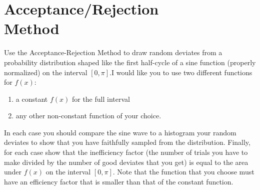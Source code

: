 \section{Acceptance/Rejection \\Method}

Use the Acceptance-Rejection Method to
draw random deviates from a probability distribution shaped like the first half-cycle of a sine
function (properly normalized) on the interval $[0,\pi]$.I would like you to use two different
functions for $f(x)$:
\begin{enumerate}
    \item a constant $f(x)$ for the full interval
    \item any other non-constant function of your choice.
\end{enumerate}

In each case you should compare the sine wave to a histogram your random deviates to show
that you have faithfully sampled from the distribution. Finally, for each case show that the
inefficiency factor (the number of trials you have to make divided by the number of good deviates
that you get) is equal to the area under $f(x)$ on the interval $[0,\pi]$. Note that the function that
you choose must have an efficiency factor that is smaller than that of the constant function.